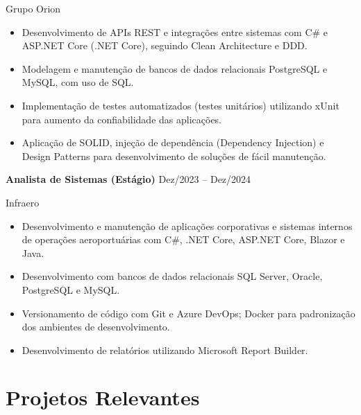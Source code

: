 \documentclass[11pt,a4paper]{article}
\begin{document}
Grupo Orion

\begin{itemize}[leftmargin=*,noitemsep,topsep=2pt]

\item Desenvolvimento de APIs REST e integrações entre sistemas com C\# e ASP.NET Core (.NET Core), seguindo Clean Architecture e DDD.

\item Modelagem e manutenção de bancos de dados relacionais PostgreSQL e MySQL, com uso de SQL.

\item Implementação de testes automatizados (testes unitários) utilizando xUnit para aumento da confiabilidade das aplicações.

\item Aplicação de SOLID, injeção de dependência (Dependency Injection) e Design Patterns para desenvolvimento de soluções de fácil manutenção.

\end{itemize}

\vspace{0.2cm}

\textbf{Analista de Sistemas (Estágio)}
\hfill Dez/2023 -- Dez/2024

Infraero

\begin{itemize}[leftmargin=*,noitemsep,topsep=2pt]

\item Desenvolvimento e manutenção de aplicações corporativas e sistemas internos de operações aeroportuárias com C\#, .NET Core, ASP.NET Core, Blazor e Java.

\item Desenvolvimento com bancos de dados relacionais SQL Server, Oracle, PostgreSQL e MySQL.

\item Versionamento de código com Git e Azure DevOps; Docker para padronização dos ambientes de desenvolvimento.

\item Desenvolvimento de relatórios utilizando Microsoft Report Builder.

\end{itemize}

\section{Projetos Relevantes}
\end{document}
